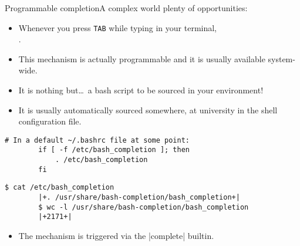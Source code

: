 
\begin{frame}[fragile]{Programmable completion}{A complex world plenty of opportunities: \enspace{}}
    \vspace{-3mm}
    \begin{itemize}
        \item Whenever you press \texttt{TAB} while typing in your terminal,\\ .
        \item This mechanism is actually programmable and it is usually available system-wide.
        \item It is nothing but\ldots\ a bash script to be sourced in your environment!
        \item It is usually automatically sourced somewhere, at university in the shell configuration file.
    \end{itemize}
    \begin{lstlisting}[style=myBash, numbers=none, aboveskip=2mm]
        # In a default ~/.bashrc file at some point:
        if [ -f /etc/bash_completion ]; then
            . /etc/bash_completion
        fi
    \end{lstlisting}
    \begin{lstlisting}[style=myBash, numbers=none, aboveskip=2mm, belowskip=-5mm]
        $ cat /etc/bash_completion
        |+. /usr/share/bash-completion/bash_completion+|
        $ wc -l /usr/share/bash-completion/bash_completion
        |+2171+|
    \end{lstlisting}
    \begin{itemize}
        \item The mechanism is triggered via the \bash|complete| builtin.
    \end{itemize}
\end{frame}
